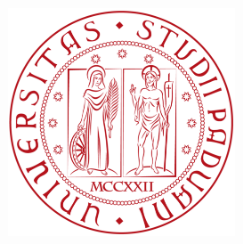 \begin{titlepage}
	\begin{addmargin}[-1cm]{-3cm}
    \begin{center}
        \large  

        \hfill

        \vfill

        \begingroup
            \color{Maroon}\spacedallcaps{\myTitle} \\ \bigskip
        \endgroup

        \spacedlowsmallcaps{\myName}

        \vfill

        \includegraphics[width=6cm]{images/pdf/logo_unipd.pdf} \\ \medskip

        \myDepartment \\                            
        \myUni \\ \bigskip

        \myTime\ 

        \vfill                      

    \end{center}  
  \end{addmargin}       
\end{titlepage}   
